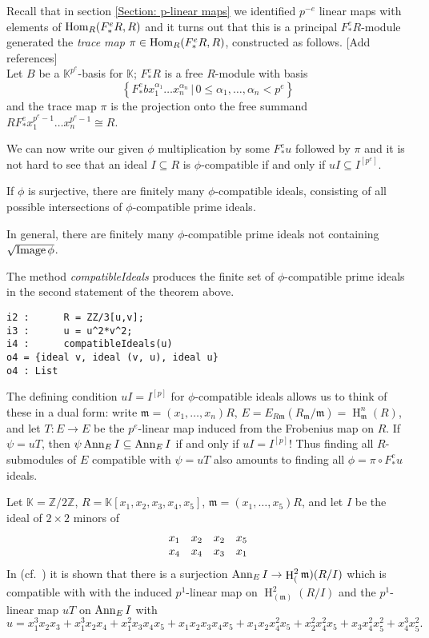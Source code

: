 \documentclass[11pt]{amsart}
\DeclareMathOperator{\HH}{H}
\begin{document}
Recall that in section \ref{Section: p-linear maps} we identified $p^{-e}$ linear maps
with elements of $\operatorname{Hom}_R(F_*^e R, R)$ and it turns out that this is a principal $F_*^e R$-module generated
the \emph{trace map} $\pi\in \operatorname{Hom}_R(F_*^e R, R)$, constructed as follows.  {\hfill\large\color{red} [Add references]}\\
Let $B$ be a $\mathbb{K}^{p^e}$-basis for $\mathbb{K}$; 
$F_*^e R$ is a free $R$-module with basis 
$$\left\{ F_*^e b x_1^{\alpha_1} \dots x_n^{\alpha_n} \,|\, 0\leq \alpha_1, \dots, \alpha_n < p^e \right\}$$
and the trace map $\pi$ is the projection onto the free summand 
$R F_*^e  x_1^{p^e-1} \dots x_n^{p^e-1}\cong R$.

We can now write our given $\phi$ multiplication by some $F_*^e u$ followed by $\pi$ and it is not hard to see that
an ideal $I\subseteq R$ is $\phi$-compatible if and only if $u I \subseteq I^{[p^e]}$.

\begin{theorem}
If $\phi$ is surjective, there are finitely many $\phi$-compatible ideals, consisting of all possible intersections
of $\phi$-compatible prime ideals.

In general, there are finitely many $\phi$-compatible prime ideals not containing $\sqrt{\operatorname{Image} \phi}$.
 
\end{theorem}

The method \emph{compatibleIdeals} produces the finite set of $\phi$-compatible prime ideals in the second statement of the theorem above.

\begin{verbatim}
i2 :      R = ZZ/3[u,v];
i3 :      u = u^2*v^2;
i4 :      compatibleIdeals(u)
o4 = {ideal v, ideal (v, u), ideal u}
o4 : List
\end{verbatim}

The defining condition $u I = I^{[p]}$ for $\phi$-compatible ideals allows us to
think of these in a dual form: write $\mathfrak{m}=(x_1, \dots, x_n)R$,
$E=E_{R\mathfrak{m}}(R_{\mathfrak{m}}/\mathfrak{m})=\HH^n_{\mathfrak{m}} (R)$, and let $T: E \rightarrow E$ be the $p^e$-linear map
induced from the Frobenius map on $R$.
If $\psi=u T$, then $\psi \operatorname{{Ann}}_E I \subseteq \operatorname{{Ann}}_E I$ if and only if $u I = I^{[p]}$!
Thus finding all $R$-submodules of $E$ compatible with $\psi=u T$ also amounts to finding all 
$\phi=\pi \circ F_*^e u$ ideals.


Let $\mathbb{K}=\mathbb{Z}/2\mathbb{Z}$, $R=\mathbb{K}[x_1, x_2, x_3, x_4, x_5]$, $\mathfrak{m}=(x_1, \dots, x_5)R$, and let $I$ be the ideal of
$2\times 2$ minors of
$$
\begin{array}{c c c c}
 x_1 & x_2 & x_2 & x_5\\
 x_4 & x_4 & x_3 & x_1
\end{array}
$$
In (cf.~\cite[\S 9]{KatzmanParameterTestIdealOfCMRings}) it is shown that
there is a surjection $\Ann_E I \rightarrow \HH^2_(\mathfrak{m}) (R/I)$
which is compatible with with the induced $p^1$-linear map on $\HH^2_(\mathfrak{m}) (R/I)$
and the $p^1$-linear map $u T$ on $\operatorname{{Ann}}_E I$ with 
$$u=x_1^3x_2x_3 + x_1^3x_2x_4+x_1^2x_3x_4x_5+ x_1x_2x_3x_4x_5+ x_1x_2x_4^2x_5+ x_2^2x_4^2x_5+x_3x_4^2x_5^2+ x_4^3x_5^2 .$$   
\end{document}
